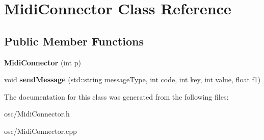 \hypertarget{classMidiConnector}{}\section{Midi\+Connector Class Reference}
\label{classMidiConnector}
\subsection*{Public Member Functions}
\begin{DoxyCompactItemize}
\item 
{\bfseries Midi\+Connector} (int p)\hypertarget{classMidiConnector_a1629e8c842409a21dbc78258794556cc}{}\label{classMidiConnector_a1629e8c842409a21dbc78258794556cc}

\item 
void {\bfseries send\+Message} (std\+::string message\+Type, int code, int key, int value, float f1)\hypertarget{classMidiConnector_a700ee4383b29cd2bdc73f7cfc61a360e}{}\label{classMidiConnector_a700ee4383b29cd2bdc73f7cfc61a360e}

\end{DoxyCompactItemize}


The documentation for this class was generated from the following files\+:\begin{DoxyCompactItemize}
\item 
osc/Midi\+Connector.\+h\item 
osc/Midi\+Connector.\+cpp\end{DoxyCompactItemize}
